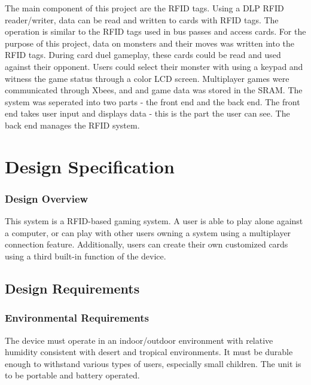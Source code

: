 \documentclass[12pt]{article} %
\begin{document}
The main component of this project are the RFID tags. Using a DLP RFID reader/writer, data can be read and written to cards with RFID tags. The operation is similar to the RFID tags used in bus passes and access cards. For the purpose of this project, data on monsters and their moves was written into the RFID tags. During card duel gameplay, these cards could be read and used against their opponent. Users could select their monster with using a keypad and witness the game status through a color LCD screen. Multiplayer games were communicated through Xbees, and and game data was stored in the SRAM. The system was seperated into two parts - the front end and the back end. The front end takes user input and displays data - this is the part the user can see. The back end manages the RFID system.

\section{Design Specification}\label{sec:designSpec} 

\subsubsection{Design Overview}
This system is a RFID-based gaming system. A user is able to play alone against a computer, or can play with other users owning a system using a multiplayer connection feature. Additionally, users can create their own customized cards using a third built-in function of the device.

\subsection{Design Requirements}\label{sec:requirements} %
\subsubsection{Environmental Requirements}

The device must operate in an indoor/outdoor environment with relative
humidity consistent with desert and tropical environments. It must be durable
enough to withstand various types of users, especially small children.  The
unit is to be portable and battery operated.
\end{document}
